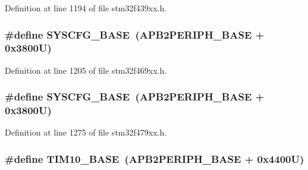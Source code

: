 Definition at line 1194 of file stm32f439xx.\+h.

\subsubsection[{\texorpdfstring{S\+Y\+S\+C\+F\+G\+\_\+\+B\+A\+SE}{SYSCFG_BASE}}]{\setlength{\rightskip}{0pt plus 5cm}\#define S\+Y\+S\+C\+F\+G\+\_\+\+B\+A\+SE~({\bf A\+P\+B2\+P\+E\+R\+I\+P\+H\+\_\+\+B\+A\+SE} + 0x3800\+U)}\hypertarget{group___peripheral__memory__map_ga62246020bf3b34b6a4d8d0e84ec79d3d}{}\label{group___peripheral__memory__map_ga62246020bf3b34b6a4d8d0e84ec79d3d}


Definition at line 1205 of file stm32f469xx.\+h.

\subsubsection[{\texorpdfstring{S\+Y\+S\+C\+F\+G\+\_\+\+B\+A\+SE}{SYSCFG_BASE}}]{\setlength{\rightskip}{0pt plus 5cm}\#define S\+Y\+S\+C\+F\+G\+\_\+\+B\+A\+SE~({\bf A\+P\+B2\+P\+E\+R\+I\+P\+H\+\_\+\+B\+A\+SE} + 0x3800\+U)}\hypertarget{group___peripheral__memory__map_ga62246020bf3b34b6a4d8d0e84ec79d3d}{}\label{group___peripheral__memory__map_ga62246020bf3b34b6a4d8d0e84ec79d3d}


Definition at line 1275 of file stm32f479xx.\+h.

\subsubsection[{\texorpdfstring{T\+I\+M10\+\_\+\+B\+A\+SE}{TIM10_BASE}}]{\setlength{\rightskip}{0pt plus 5cm}\#define T\+I\+M10\+\_\+\+B\+A\+SE~({\bf A\+P\+B2\+P\+E\+R\+I\+P\+H\+\_\+\+B\+A\+SE} + 0x4400\+U)}\hypertarget{group___peripheral__memory__map_ga3eff32f3801db31fb4b61d5618cad54a}{}\label{group___peripheral__memory__map_ga3eff32f3801db31fb4b61d5618cad54a}


